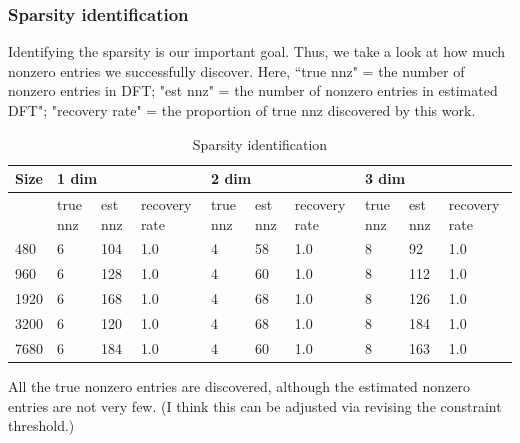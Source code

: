 \documentclass[final,onefignum,onetabnum]{siamart190516}
\begin{document}
\subsubsection{Sparsity identification}
Identifying the sparsity is our important goal. Thus, we take a look at how much nonzero entries we successfully discover. Here, ``true nnz" = the number of nonzero entries in DFT; "est nnz" = the number of nonzero entries in estimated DFT"; "recovery rate" = the proportion of true nnz discovered by this work.
\begin{table}[H]
\caption{Sparsity identification}
\begin{tabular}{|l|lll|lll|lll|}
\hline
Size & \multicolumn{3}{l|}{1 dim}                                                         & \multicolumn{3}{l|}{2 dim}                                                         & \multicolumn{3}{l|}{3 dim}                                                        \\ \hline
     & \multicolumn{1}{l|}{true nnz} & \multicolumn{1}{l|}{est nnz} & recovery rate & \multicolumn{1}{l|}{true nnz} & \multicolumn{1}{l|}{est nnz} & recovery rate & \multicolumn{1}{l|}{true nnz} & \multicolumn{1}{l|}{est nnz} & recovery rate \\ \hline
480  & \multicolumn{1}{l|}{6}        & \multicolumn{1}{l|}{104}     & 1.0                 & \multicolumn{1}{l|}{4}        & \multicolumn{1}{l|}{58}      & 1.0                 & \multicolumn{1}{l|}{8}        & \multicolumn{1}{l|}{92}      & 1.0                \\ \hline
960  & \multicolumn{1}{l|}{6}        & \multicolumn{1}{l|}{128}     & 1.0                 & \multicolumn{1}{l|}{4}        & \multicolumn{1}{l|}{60}      & 1.0                 & \multicolumn{1}{l|}{8}        & \multicolumn{1}{l|}{112}     & 1.0                \\ \hline
1920 & \multicolumn{1}{l|}{6}        & \multicolumn{1}{l|}{168}     & 1.0                 & \multicolumn{1}{l|}{4}        & \multicolumn{1}{l|}{68}      & 1.0                 & \multicolumn{1}{l|}{8}        & \multicolumn{1}{l|}{126}     & 1.0                \\ \hline
3200 & \multicolumn{1}{l|}{6}        & \multicolumn{1}{l|}{120}     & 1.0                 & \multicolumn{1}{l|}{4}        & \multicolumn{1}{l|}{68}      & 1.0                 & \multicolumn{1}{l|}{8}        & \multicolumn{1}{l|}{184}     & 1.0                \\ \hline
7680 & \multicolumn{1}{l|}{6}        & \multicolumn{1}{l|}{184}     & 1.0                 & \multicolumn{1}{l|}{4}        & \multicolumn{1}{l|}{60}      & 1.0                 & \multicolumn{1}{l|}{8}        & \multicolumn{1}{l|}{163}     & 1.0                \\ \hline
\end{tabular}
\end{table}
All the true nonzero entries are discovered, although the estimated nonzero entries are not very few. (I think this can be adjusted via revising the constraint threshold.)
\end{document}

